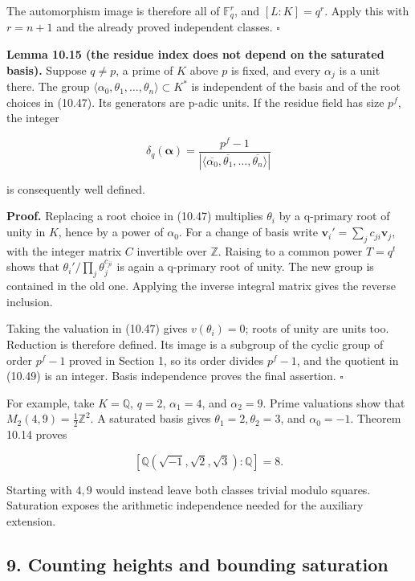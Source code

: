 \documentclass[
  11pt,
  a4paper,
]{article}
\begin{document}
The automorphism image is therefore all of \(\mathbb F_q^r\), and
\([L:K]=q^r\). Apply this with \(r=n+1\) and the already proved
independent classes. \(\square\)

\textbf{Lemma 10.15 (the residue index does not depend on the saturated
basis).} Suppose \(q\ne p\), a prime of \(K\) above \(p\) is fixed, and
every \(\alpha_j\) is a unit there. The group
\(\langle\alpha_0,\theta_1,\ldots,\theta_n\rangle\subset K^*\) is
independent of the basis and of the root choices in (10.47). Its
generators are p-adic units. If the residue field has size \(p^f\), the
integer

\[
 \delta_q(\boldsymbol\alpha)=
 \frac{p^f-1}{|\langle\overline{\alpha_0},\overline{\theta_1},
 \ldots,\overline{\theta_n}\rangle|}
\tag{10.49}
\]

is consequently well defined.

\textbf{Proof.} Replacing a root choice in (10.47) multiplies
\(\theta_i\) by a q-primary root of unity in \(K\), hence by a power of
\(\alpha_0\). For a change of basis write
\(\boldsymbol v_i'=\sum_j c_{ji}\boldsymbol v_j\), with the integer
matrix \(C\) invertible over \(\mathbb Z\). Raising to a common power
\(T=q^t\) shows that \(\theta_i'/\prod_j\theta_j^{c_{ji}}\) is again a
q-primary root of unity. The new group is contained in the old one.
Applying the inverse integral matrix gives the reverse inclusion.

Taking the valuation in (10.47) gives \(v(\theta_i)=0\); roots of unity
are units too. Reduction is therefore defined. Its image is a subgroup
of the cyclic group of order \(p^f-1\) proved in Section 1, so its order
divides \(p^f-1\), and the quotient in (10.49) is an integer. Basis
independence proves the final assertion. \(\square\)

For example, take \(K=\mathbb Q\), \(q=2\), \(\alpha_1=4\), and
\(\alpha_2=9\). Prime valuations show that
\(M_2(4,9)=\tfrac12\mathbb Z^2\). A saturated basis gives
\(\theta_1=2,\theta_2=3\), and \(\alpha_0=-1\). Theorem 10.14 proves

\[
 [\mathbb Q(\sqrt{-1},\sqrt2,\sqrt3):\mathbb Q]=8.
\]

Starting with \(4,9\) would instead leave both classes trivial modulo
squares. Saturation exposes the arithmetic independence needed for the
auxiliary extension.

\subsection{9. Counting heights and bounding
saturation}\label{counting-heights-and-bounding-saturation}
\end{document}
